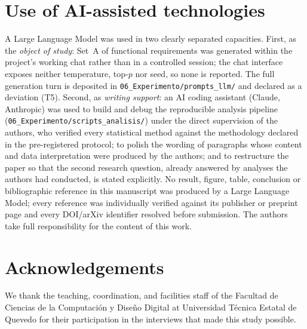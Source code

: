 \documentclass{llncs}
\begin{document}
\section*{Use of AI-assisted technologies}
A Large Language Model was used in two clearly separated capacities. First, as the
\emph{object of study}: Set~A of functional requirements was generated within the
project's working chat rather than in a controlled session; the chat interface exposes
neither temperature, top-$p$ nor seed, so none is reported. The full generation turn is
deposited in \nolinkurl{06_Experimento/prompts_llm/} and declared as a deviation (T5).
Second, as \emph{writing support}: an AI
coding assistant (Claude, Anthropic) was used to build and debug the reproducible
analysis pipeline (\nolinkurl{06_Experimento/scripts_analisis/}) under the direct
supervision of the authors, who verified every statistical method against the
methodology declared in the pre-registered protocol; to polish the wording of
paragraphs whose content and data interpretation were produced by the authors; and to
restructure the paper so that the second research question, already answered by analyses
the authors had conducted, is stated explicitly. No
result, figure, table, conclusion or bibliographic reference in this manuscript was
produced by a Large Language Model; every reference was individually verified against
its publisher or preprint page and every DOI/arXiv identifier resolved before
submission. The authors take full responsibility for the content of this work.

\section*{Acknowledgements}
We thank the teaching, coordination, and facilities staff of the Facultad de Ciencias
de la Computaci\'on y Dise\~no Digital at Universidad T\'ecnica Estatal de Quevedo for
their participation in the interviews that made this study possible.



\end{document}
